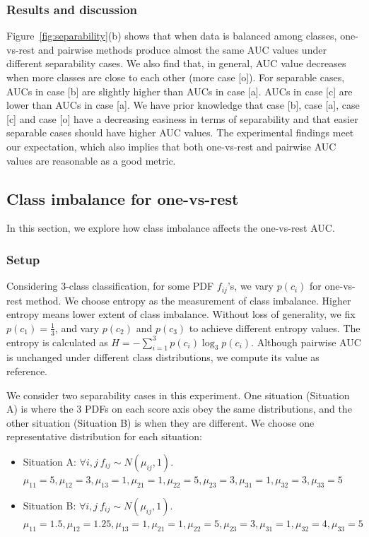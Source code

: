 \documentclass[twoside,11pt]{article}
\renewcommand{\>}{{\rightarrow}}
\newcommand{\1}{{\mathbf 1}}
\newcommand{\0}{{\mathbf 0}}
\begin{document}
\subsubsection{Results and discussion}
Figure~\ref{fig:separability}(b) shows that when data is balanced among classes, one-vs-rest and pairwise methods produce almost the same AUC values under different separability cases. %
We also find that, in general, AUC value decreases when more
classes are close to each other
(more case [o]). For separable cases, AUCs in case [b] are slightly higher than AUCs in case [a]. AUCs in case [c] are lower than AUCs in case [a]. We have prior knowledge that case [b], case [a], case [c] and case [o] have a decreasing easiness in terms of separability and that easier separable cases should have higher AUC values. The experimental findings meet our expectation, which also implies that both one-vs-rest and pairwise AUC values are reasonable as a good metric.

\subsection{Class imbalance for one-vs-rest}
In this section, we explore how class imbalance affects the one-vs-rest AUC.

\subsubsection{Setup}
Considering 3-class classification, for some PDF $f_{ij}$'s, we vary $p(c_i)$ for one-vs-rest method. We choose entropy as the measurement of class imbalance. Higher entropy means lower extent of class imbalance. Without loss of generality, we fix $p(c_1)=\frac{1}{3}$, and vary $p(c_2)$ and $p(c_3)$ to achieve different entropy values. The entropy is calculated as $H=-\sum_{i=1}^3 p(c_i)\log_3 p(c_i)$.
Although pairwise AUC is unchanged under different class distributions, we compute its value as reference.

We consider two separability cases in this experiment. One situation (Situation A) is where the 3 PDFs on each score axis obey the same distributions, and the other situation (Situation B) is when they are different. We choose one representative distribution for each situation:
\begin{itemize}
\item Situation A: 
$\forall i,j \ f_{ij} \sim N(\mu_{ij},1)$. $\mu_{11}=5,\mu_{12}=3,\mu_{13}=1, \mu_{21}=1,\mu_{22}=5,\mu_{23}=3, \mu_{31}=1,\mu_{32}=3,\mu_{33}=5$
\item Situation B: 
$\forall i,j \ f_{ij} \sim N(\mu_{ij},1)$. $\mu_{11}=1.5, \mu_{12}=1.25, \mu_{13}=1, \mu_{21}=1, \mu_{22}=5, \mu_{23}=3, \mu_{31}=1, \mu_{32}=4, \mu_{33}=5$
\end{itemize}
\end{document}
